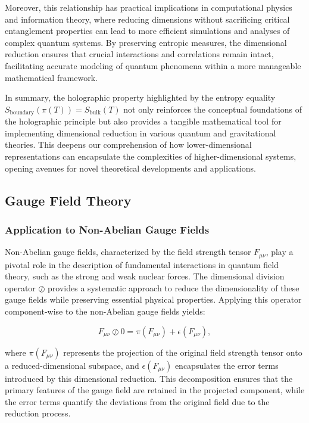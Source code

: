 \documentclass[sn-mathphys-num]{sn-jnl}
\theoremstyle{thmstyleone}
\theoremstyle{thmstyletwo}
\theoremstyle{thmstylethree}
\begin{document}
Moreover, this relationship has practical implications in computational physics and information theory, where reducing dimensions without sacrificing critical entanglement properties can lead to more efficient simulations and analyses of complex quantum systems. By preserving entropic measures, the dimensional reduction ensures that crucial interactions and correlations remain intact, facilitating accurate modeling of quantum phenomena within a more manageable mathematical framework.

In summary, the holographic property highlighted by the entropy equality $S_{\text{boundary}}(\pi(T)) = S_{\text{bulk}}(T)$ not only reinforces the conceptual foundations of the holographic principle but also provides a tangible mathematical tool for implementing dimensional reduction in various quantum and gravitational theories. This deepens our comprehension of how lower-dimensional representations can encapsulate the complexities of higher-dimensional systems, opening avenues for novel theoretical developments and applications.

\subsection{Gauge Field Theory}
\subsubsection{Application to Non-Abelian Gauge Fields}

Non-Abelian gauge fields, characterized by the field strength tensor \( F_{\mu\nu} \), play a pivotal role in the description of fundamental interactions in quantum field theory, such as the strong and weak nuclear forces. The dimensional division operator \( \oslash \) provides a systematic approach to reduce the dimensionality of these gauge fields while preserving essential physical properties. Applying this operator component-wise to the non-Abelian gauge fields yields:

\[
F_{\mu\nu} \oslash 0 = \pi(F_{\mu\nu}) + \epsilon(F_{\mu\nu}),
\]

where \( \pi(F_{\mu\nu}) \) represents the projection of the original field strength tensor onto a reduced-dimensional subspace, and \( \epsilon(F_{\mu\nu}) \) encapsulates the error terms introduced by this dimensional reduction. This decomposition ensures that the primary features of the gauge field are retained in the projected component, while the error terms quantify the deviations from the original field due to the reduction process.
\end{document}
